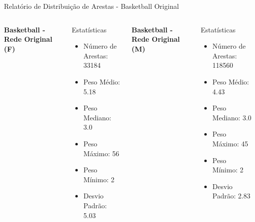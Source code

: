 
\begin{frame}{Relatório de Distribuição de Arestas - Basketball Original}
    \begin{columns}
        \textbf{Basketball - Rede Original (F)}
        \begin{block}{Estatísticas}
            \begin{itemize}
                \item Número de Arestas: 33184
                \item Peso Médio: 5.18
                \item Peso Mediano: 3.0
                \item Peso Máximo: 56
                \item Peso Mínimo: 2
                \item Desvio Padrão: 5.03
            \end{itemize}
        \end{block}

        \textbf{Basketball - Rede Original (M)}
        \begin{block}{Estatísticas}
            \begin{itemize}
                \item Número de Arestas: 118560
                \item Peso Médio: 4.43
                \item Peso Mediano: 3.0
                \item Peso Máximo: 45
                \item Peso Mínimo: 2
                \item Desvio Padrão: 2.83
            \end{itemize}
        \end{block}
    \end{columns}
\end{frame}